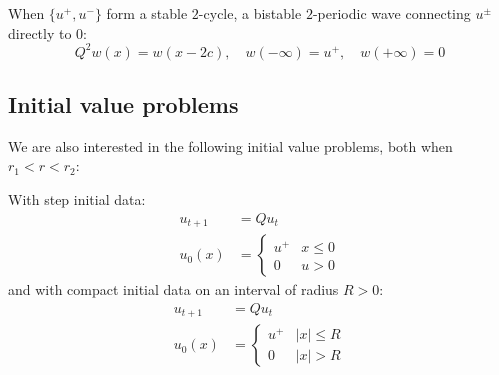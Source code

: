 \documentclass{article}
\theoremstyle{definition}
\numberwithin{equation}{section}
\begin{document}
When $\{u^+,u^-\}$ form a stable $2$-cycle, a bistable $2$-periodic wave connecting $u^\pm$ directly to $0$:
\begin{equation} \tag{BPTW}
Q^2w(x)=w(x-2c), \quad w(-\infty)=u^+, \quad w(+\infty)=0
\end{equation}


\subsection{Initial value problems}

We are also interested in the following initial value problems, both when $r_1 < r < r_2$:

With step initial data:
\begin{equation} \tag{IVP}
\begin{aligned}
u_{t+1} &= Qu_t \\
u_0(x) &= \begin{cases} u^+ & x \leq 0 \\ 0 & u > 0 \end{cases}
\end{aligned}
\end{equation}
and with compact initial data on an interval of radius $R>0$:
\begin{equation} \tag{IVP}
\begin{aligned}
u_{t+1} &= Qu_t \\
u_0(x) &= \begin{cases} u^+ & |x| \leq R \\ 0 & |x| > R \end{cases}
\end{aligned}
\end{equation}



\end{document}
